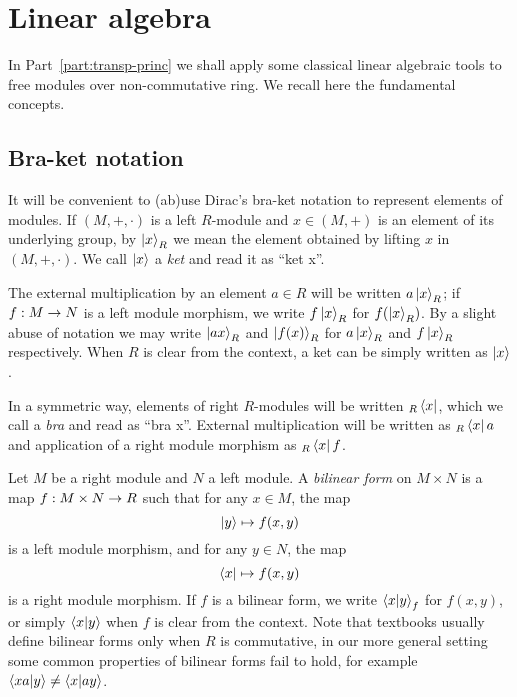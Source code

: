 \section{Linear algebra}
\label{sec:linear-algebra}
In Part~\ref{part:transp-princ} we shall apply some classical linear
algebraic tools to free modules over non-commutative ring. We recall
here the fundamental concepts.


\subsection{Bra-ket notation}
\label{sec:linear-algebra:bra-ket}

It will be convenient to (ab)use Dirac's
bra-ket notation to represent elements of
modules. If $(M,+,\cdot)$ is a left $R$-module and $x\in (M,+)$ is an
element of its underlying group, by $\left\lvert x \right\rangle_R$ we mean the element
obtained by lifting $x$ in $(M,+,\cdot)$. We call
$\left\lvert x \right\rangle$ a
\textit{ket} and read it as ``ket x''.

The external multiplication by an element $a\in R$ will be written
$a\left\lvert x \right\rangle_R$; if $f:M\rightarrow N$ is a left module morphism, we write
$f\left\lvert x \right\rangle_R$ for $f(\left\lvert x \right\rangle_R)$. By a slight abuse of notation we may
write $\left\lvert a x \right\rangle_R$ and $\left\lvert f(x) \right\rangle_R$ for $a\left\lvert x \right\rangle_R$ and
$f\left\lvert x \right\rangle_R$ respectively. When $R$ is clear from the context, a ket
can be simply written as $\left\lvert x \right\rangle$.

In a symmetric way, elements of right $R$-modules will be written
${}_R\left\langle x \right\rvert$, which we call a \textit{bra} and read as
``bra x''. External multiplication will be written as ${}_R\left\langle x \right\rvert a$
and application of a right module morphism as ${}_R\left\langle x \right\rvert f$.

Let $M$ be a right module and $N$ a left module. A
\textit{bilinear
  form} on
$M\times N$ is a map $f:M\times N\rightarrow R$ such that for any $x\in M$,
the map
\[\left\lvert y \right\rangle\mapsto f(x, y)\]
is a left module morphism, and for any $y\in N$, the map
\[\left\langle x \right\rvert\mapsto f(x, y)\]
is a right module morphism. If $f$ is a bilinear form, we write
$\left\langle x \middle| y \right\rangle_f$ for $f(x,y)$, or simply $\left\langle x \middle| y \right\rangle$
when $f$ is clear from the context. Note that textbooks usually define
bilinear forms only when $R$ is commutative, in our more general
setting some common properties of bilinear forms fail to hold,
for example $\left\langle xa \middle| y \right\rangle\ne\left\langle x \middle| ay \right\rangle$.

